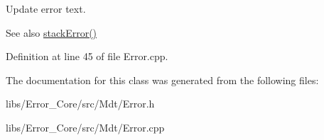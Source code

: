 Update error text. 

\begin{DoxySeeAlso}{See also}
\hyperlink{class_mdt_1_1_error_a4133276f217c5a6dac890a18059607cd}{stack\+Error()} 
\end{DoxySeeAlso}


Definition at line 45 of file Error.\+cpp.



The documentation for this class was generated from the following files\+:\begin{DoxyCompactItemize}
\item 
libs/\+Error\+\_\+\+Core/src/\+Mdt/Error.\+h\item 
libs/\+Error\+\_\+\+Core/src/\+Mdt/Error.\+cpp\end{DoxyCompactItemize}
